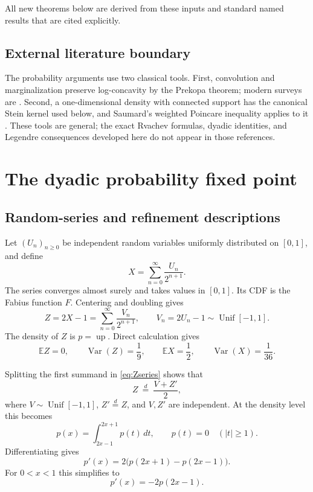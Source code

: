 \documentclass[11pt,oneside]{article}
\theoremstyle{definition}
\theoremstyle{remark}
\newcommand{\Up}{\operatorname{up}}
\newcommand{\Var}{\operatorname{Var}}
\newcommand{\E}{\mathbb E}
\begin{document}
All new theorems below are derived from these inputs and standard named results
that are cited explicitly.

\subsection{External literature boundary}
The probability arguments use two classical tools.  First, convolution and
marginalization preserve log-concavity by the Prekopa theorem; modern surveys are
\cite{samworth,saumardwellner}.  Second, a one-dimensional density with connected
support has the canonical Stein kernel used below, and Saumard's weighted Poincare
inequality applies to it \cite{saumard}.  These tools are general; the exact
Rvachev formulas, dyadic identities, and Legendre consequences developed here do
not appear in those references.

\section{The dyadic probability fixed point}

\subsection{Random-series and refinement descriptions}
Let $(U_n)_{n\ge0}$ be independent random variables uniformly distributed on
$[0,1]$, and define
\begin{equation}\label{eq:Xseries}
 X=\sum_{n=0}^{\infty}\frac{U_n}{2^{n+1}}.
\end{equation}
The series converges almost surely and takes values in $[0,1]$.  Its CDF is the
Fabius function $F$.  Centering and doubling gives
\begin{equation}\label{eq:Zseries}
 Z=2X-1=\sum_{n=0}^{\infty}\frac{V_n}{2^{n+1}},
 \qquad V_n=2U_n-1\sim\operatorname{Unif}[-1,1].
\end{equation}
The density of $Z$ is $p=\Up$.  Direct calculation gives
\begin{equation}\label{eq:moments-basic}
 \E Z=0,\qquad \Var(Z)=\frac19,
 \qquad \E X=\frac12,\qquad \Var(X)=\frac1{36}.
\end{equation}

Splitting the first summand in \eqref{eq:Zseries} shows that
\begin{equation}\label{eq:distributional-recursion}
 Z\ \stackrel{d}=\ \frac{V+Z'}2,
\end{equation}
where $V\sim\operatorname{Unif}[-1,1]$, $Z'\stackrel d=Z$, and $V,Z'$ are
independent.  At the density level this becomes
\begin{equation}\label{eq:refinement}
 p(x)=\int_{2x-1}^{2x+1}p(t)\,dt,
 \qquad p(t)=0\quad(|t|\ge1).
\end{equation}
Differentiating gives
\begin{equation}\label{eq:refinement-derivative}
 p'(x)=2\bigl(p(2x+1)-p(2x-1)\bigr).
\end{equation}
For $0<x<1$ this simplifies to
\begin{equation}\label{eq:positive-derivative}
 p'(x)=-2p(2x-1).
\end{equation}
\end{document}
